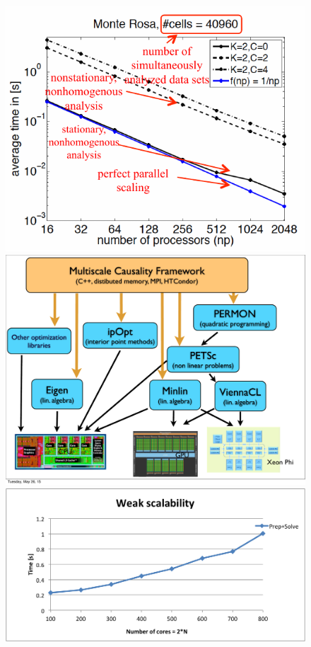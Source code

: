 \documentclass[a0,portrait]{a0poster}
\begin{document}
\begin{multicols}{2}
\begin{figure}[H]
\begin{center} \centerline{
\includegraphics[width=12cm]{Scaling.pdf}
\includegraphics[width=12cm]{Library_Hierarchy.pdf}
\includegraphics[width=14cm]{FLLOP_weak_scalability.png}}

\end{center}
\end{figure}
\end{multicols}
\end{document}
